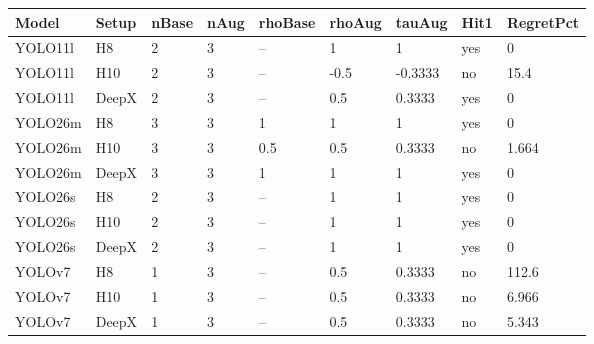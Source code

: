 \begin{tabular}{lllllllll}
\hline
Model & Setup & nBase & nAug & rhoBase & rhoAug & tauAug & Hit1 & RegretPct \\
\hline
YOLO11l & H8 & 2 & 3 & -- & 1 & 1 & yes & 0 \\
YOLO11l & H10 & 2 & 3 & -- & -0.5 & -0.3333 & no & 15.4 \\
YOLO11l & DeepX & 2 & 3 & -- & 0.5 & 0.3333 & yes & 0 \\
YOLO26m & H8 & 3 & 3 & 1 & 1 & 1 & yes & 0 \\
YOLO26m & H10 & 3 & 3 & 0.5 & 0.5 & 0.3333 & no & 1.664 \\
YOLO26m & DeepX & 3 & 3 & 1 & 1 & 1 & yes & 0 \\
YOLO26s & H8 & 2 & 3 & -- & 1 & 1 & yes & 0 \\
YOLO26s & H10 & 2 & 3 & -- & 1 & 1 & yes & 0 \\
YOLO26s & DeepX & 2 & 3 & -- & 1 & 1 & yes & 0 \\
YOLOv7 & H8 & 1 & 3 & -- & 0.5 & 0.3333 & no & 112.6 \\
YOLOv7 & H10 & 1 & 3 & -- & 0.5 & 0.3333 & no & 6.966 \\
YOLOv7 & DeepX & 1 & 3 & -- & 0.5 & 0.3333 & no & 5.343 \\
\hline
\end{tabular}

